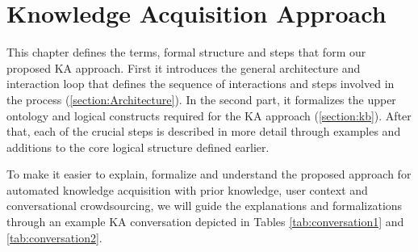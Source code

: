 % 
\chapter{Knowledge Acquisition Approach}
\label{chapter:approach}

This chapter defines the terms, formal structure and steps that form our 
proposed KA approach. First it introduces the general architecture and 
interaction loop that defines the sequence of interactions and steps
involved in the process (\autoref{section:Architecture}). In the second part, it
formalizes the upper ontology and logical constructs required for the KA 
approach (\autoref{section:kb}). After that, each of the crucial steps is 
described in more detail through examples and additions to the core logical 
structure defined earlier.

To make it easier to explain, formalize and understand the proposed approach 
for automated knowledge acquisition with prior knowledge, user context and 
conversational crowdsourcing, we will guide the explanations and formalizations
through an example KA conversation depicted in Tables \ref{tab:conversation1}
and \ref{tab:conversation2}.

\newcommand{\step}[1]{\refstepcounter{stepno}\label{#1}}

